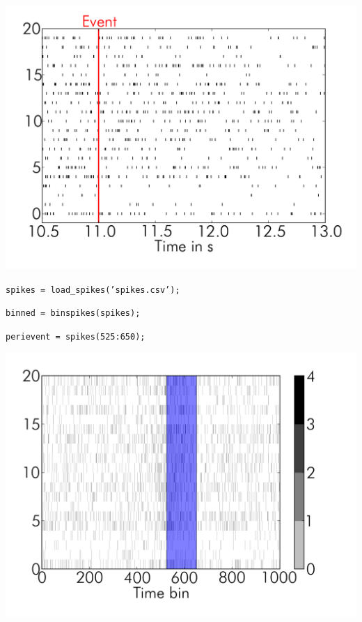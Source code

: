 \documentclass[17pt]{beamer}
\begin{document}
\begin{frame}
  \hspace*{-.055\columnwidth}
  \includegraphics[width=1.1\columnwidth]{spikes-4}
\end{frame}

\begin{frame}
  \vspace{-22pt}
  \phantom{1. Seconds or milliseconds?}
  \texttt{spikes = load\_spikes('spikes.csv');}
  \vspace{16pt}

  \phantom{2. Bin size? Do we need to bin?}
  \texttt{binned = binspikes(spikes);}
  \vspace{16pt}

  \phantom{3. When is the actual event?}
  \texttt{perievent = spikes(525:650);}
\end{frame}

\begin{frame}
  \hspace*{-.055\columnwidth}
  \includegraphics[width=1.1\columnwidth]{binned-1}
\end{frame}
\end{document}
